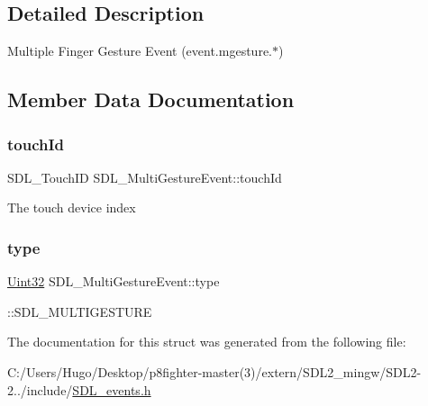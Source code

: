 \subsection{Detailed Description}
Multiple Finger Gesture Event (event.\+mgesture.$\ast$) 

\subsection{Member Data Documentation}
\mbox{\label{struct_s_d_l___multi_gesture_event_aa15d1201559a3c9277082af71a972dc1}} 
\subsubsection{\texorpdfstring{touch\+Id}{touchId}}
{\footnotesize\ttfamily S\+D\+L\+\_\+\+Touch\+ID S\+D\+L\+\_\+\+Multi\+Gesture\+Event\+::touch\+Id}

The touch device index \mbox{\label{struct_s_d_l___multi_gesture_event_ab0c7adc9a3f71cc3532bfe0ff8cc6120}} 
\subsubsection{\texorpdfstring{type}{type}}
{\footnotesize\ttfamily \hyperlink{_s_d_l__stdinc_8h_add440eff171ea5f55cb00c4a9ab8672d}{Uint32} S\+D\+L\+\_\+\+Multi\+Gesture\+Event\+::type}

\+::\+S\+D\+L\+\_\+\+M\+U\+L\+T\+I\+G\+E\+S\+T\+U\+RE 

The documentation for this struct was generated from the following file\+:\begin{DoxyCompactItemize}
\item 
C\+:/\+Users/\+Hugo/\+Desktop/p8fighter-\/master(3)/extern/\+S\+D\+L2\+\_\+mingw/\+S\+D\+L2-\/2../include/\hyperlink{_s_d_l__events_8h}{S\+D\+L\+\_\+events.\+h}\end{DoxyCompactItemize}
